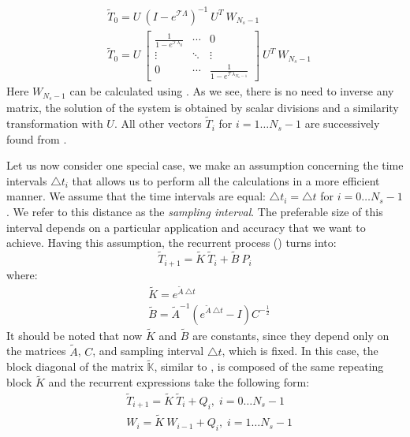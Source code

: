 \begin{align*}
  & \tilde{T}_0 = U \: (I - e^{\mathcal{T} \Lambda})^{-1} \: U^T \: W_{N_s - 1} \\
  & \tilde{T}_0 = U \: \left[
      \begin{array}{ccc}
        \frac{1}{1 - e^{\mathcal{T} \lambda_0}} & \cdots & 0 \\
        \vdots & \ddots & \vdots \\
        0 & \cdots & \frac{1}{1 - e^{\mathcal{T} \lambda_{N_n - 1}}}
      \end{array}
    \right] \: U^T \: W_{N_s - 1}
\end{align*}
Here $W_{N_s - 1}$ can be calculated using . As we see, there is no need to inverse any matrix, the solution of the system is obtained by scalar divisions and a similarity transformation with $U$. All other vectors $\tilde{T}_i$ for $i = 1 \dots N_s - 1$ are successively found from .

Let us now consider one special case, we make an assumption concerning the time intervals $\triangle t_i$ that allows us to perform all the calculations in a more efficient manner. We assume that the time intervals are equal: $\triangle t_i = \triangle t$ for $i = 0 \dots N_s - 1$. We refer to this distance as the \emph{sampling interval}. The preferable size of this interval depends on a particular application and accuracy that we want to achieve. Having this assumption, the recurrent process () turns into:
\[
  \tilde{T}_{i+1} = \tilde{K} \: \tilde{T}_i + \tilde{B} \: P_i
\]
where:
\begin{align*}
  & \tilde{K} = e^{\tilde{A} \: \triangle t} \\
  & \tilde{B} = \tilde{A}^{-1} \left( e^{\tilde{A} \: \triangle t} - I \right) C^{-\frac{1}{2}}
\end{align*}
It should be noted that now $\tilde{K}$ and $\tilde{B}$ are constants, since they depend only on the matrices $\tilde{A}$, $C$, and sampling interval $\triangle t$, which is fixed. In this case, the block diagonal of the matrix $\tilde{\mathbb{K}}$, similar to , is composed of the same repeating block $\tilde{K}$ and the recurrent expressions take the following form:
\begin{align}
  & \tilde{T}_{i + 1} = \tilde{K} \: \tilde{T}_i + Q_i, \; i = 0 \dots N_s - 1 \nonumber \\
  & W_i = \tilde{K} \: W_{i - 1} + Q_i, \; i = 1 \dots N_s - 1 \nonumber
\end{align}
